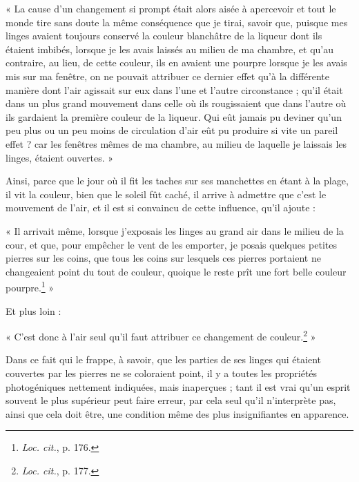 \documentclass[a4paper, 11pt, oneside, polutonikogreek, french]{article}
\begin{document}
« La cause d'un changement si prompt était alors aisée à apercevoir et tout le monde tire sans doute la même conséquence que je tirai, savoir que, puisque mes linges avaient toujours conservé la couleur blanchâtre de la liqueur dont ils étaient imbibés, lorsque je les avais laissés au milieu de ma chambre, et qu'au contraire, au lieu, de cette couleur, ils en avaient une pourpre lorsque je les avais mis sur ma fenêtre, on ne pouvait attribuer ce dernier effet qu'à la différente manière dont l'air agissait sur eux dans l'une et l'autre circonstance ; qu'il était dans un plus grand mouvement dans celle où ils rougissaient que dans l'autre où ils gardaient la première couleur de la liqueur. Qui eût jamais pu deviner qu'un peu plus ou un peu moins de circulation d'air eût pu produire si vite un pareil effet ? car les fenêtres mêmes de ma chambre, au milieu de laquelle je laissais les linges, étaient ouvertes. »

Ainsi, parce que le jour où il fit les taches sur ses manchettes en étant à la plage, il vit la couleur, bien que le soleil fût caché, il arrive à admettre que c'est le mouvement de l'air, et il est si convaincu de cette influence, qu'il ajoute :

« Il arrivait même, lorsque j'exposais les linges au grand air dans le milieu de la cour, et que, pour empêcher le vent de les emporter, je posais quelques petites pierres sur les coins, que tous les coins sur lesquels ces pierres portaient ne changeaient point du tout de couleur, quoique le reste prît une fort belle couleur pourpre.\footnote{\emph{Loc. cit.}, p. 176.} »

Et plus loin :

« C'est donc à l'air seul qu'il faut attribuer ce changement de couleur.\footnote{\emph{Loc. cit.}, p. 177.} »

Dans ce fait qui le frappe, à savoir, que les parties de ses linges qui étaient couvertes par les pierres ne se coloraient point, il y a toutes les propriétés photogéniques nettement indiquées, mais inaperçues ; tant il est vrai qu'un esprit souvent le plus supérieur peut faire erreur, par cela seul qu'il n'interprète pas, ainsi que cela doit être, une condition même des plus insignifiantes en apparence.
\end{document}
